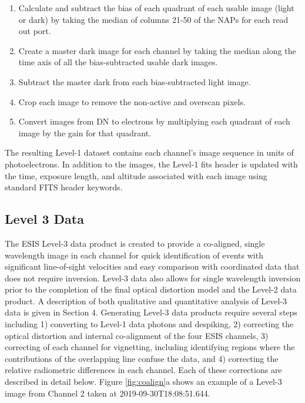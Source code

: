     	\begin{enumerate}
    	    \item Calculate and subtract the bias of each quadrant of each usable image (light or dark) by taking the median of columns 21-50 of the NAPs for each read out port.   
    	    \item Create a master dark image for each channel by taking the median along the time axis of all the bias-subtracted usable dark images.
    	    \item Subtract the master dark from each bias-subtracted light image.
    	    \item Crop each image to remove the non-active and overscan pixels.
    	    \item Convert images from DN to electrons by multiplying each quadrant of each image by the gain for that quadrant.
    	\end{enumerate}
    	The resulting Level-1 dataset contains each channel's image sequence in units of photoelectrons.
    	In addition to the images, the Level-1 fits header is updated with the time, exposure length, and altitude associated with each image using standard FITS header keywords.   
	

    \subsection{Level 3 Data}
 
    
    	\newcommand{\vigfit}{[0.44, 0.34, 0.38, 0.5]}
    	\newcommand{\levthreetime}{2019-09-30T18:08:51.644}
    	
    	The ESIS Level-3 data product is created to provide a co-aligned, single wavelength image in each channel for quick identification of events with significant line-of-sight velocities and easy comparison with coordinated data that does not require inversion. 
    	Level-3 data also allows for single wavelength inversion prior to the completion of the final optical distortion model and the Level-2 data product.  A description of both qualitative and quantitative analysis of Level-3 data is given in Section 4.  Generating Level-3 data products require several steps including 1) converting to  Level-1 data photons and despiking, 2) correcting the optical distortion and internal co-alignment of the four ESIS channels, 3) correcting of each channel for vignetting, including identifying regions where the contributions of the overlapping \mgxbright line confuse the \ov data, and 4) correcting the relative radiometric differences in each channel.  Each of these corrections are described in detail below. 
    	Figure \ref{fig:coalign}a shows an example of a Level-3 image from Channel 2  taken at \levthreetime.
    	
